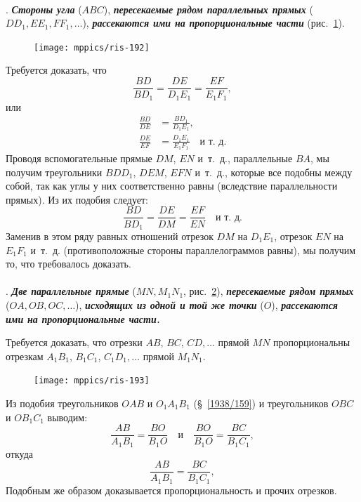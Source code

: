 \documentclass[oneside]{book}
\begin{document}
\paragraph{}\label{1938/182}
. %
\textbf{\emph{Стороны угла}} ($ABC$), \textbf{\emph{пересекаемые рядом параллельных прямых}} ($DD_1, EE_1, FF_1, \dots$), \textbf{\emph{рассекаются ими на пропорциональные части}} (рис.~\ref{1938/ris-192}).

\begin{figure}[h!]
\centering
\texttt{[image: mppics/ris-192]}
\caption{}\label{1938/ris-192}
\end{figure}

Требуется доказать, что
\[\frac{BD}{BD_1}=\frac{DE}{D_1E_1}=\frac{EF}{E_1F_1},\]
или
\begin{align*}
\frac{BD}{DE}&=\frac{BD_1}{D_1E_1},
\\
\frac{DE}{EF}&=\frac{D_1E_1}{E_1F_1}\quad\text{и т.~д.}
\end{align*}
Проводя вспомогательные прямые $DM$, $EN$ и~т.~д., параллельные $BA$, мы получим треугольники $BDD_1$, $DEM$, $EFN$ и~т.~д., которые все подобны между собой, так как углы у них соответственно равны (вследствие параллельности прямых).
Из их подобия следует:
\[\frac{BD}{BD_1}=\frac{DE}{DM}=\frac{EF}{EN}\quad\text{и т.~д.}\]
Заменив в этом ряду равных отношений отрезок $DM$ на $D_1E_1$, отрезок $EN$ на $E_1F_1$ и~т.~д.
(противоположные стороны параллелограммов равны), мы получим то, что требовалось доказать.

\paragraph{}\label{1938/183}
.
\textbf{\emph{Две параллельные прямые}} ($MN, M_1N_1$, рис.~\ref{1938/ris-193}), \textbf{\emph{пересекаемые рядом прямых}} ($OA, OB, OC, \dots$), \textbf{\emph{исходящих из одной и той же точки}} ($O$), \textbf{\emph{рассекаются ими на пропорциональные части.}}

Требуется доказать, что отрезки $AB$, $BC$, $CD,\dots$
прямой $MN$ пропорциональны отрезкам $A_1B_1$, $B_1C_1$, $C_1D_1,\dots$
прямой $M_1N_1$.

\begin{figure}[h!]
\centering
\texttt{[image: mppics/ris-193]}
\caption{}\label{1938/ris-193}
\end{figure}

Из подобия треугольников $OAB$ и $O_1A_1B_1$ (§~\ref{1938/159}) и треугольников $OBC$ и $OB_1C_1$ выводим:
\[\frac{AB}{A_1B_1}=\frac{BO}{B_1O}
\quad\text{и}\quad
\frac{BO}{B_1O}=\frac{BC}{B_1C_1},
\]
откуда
\[\frac{AB}{A_1B_1}=\frac{BC}{B_1C_1},
\]
Подобным же образом доказывается пропорциональность и прочих отрезков.
\end{document}
